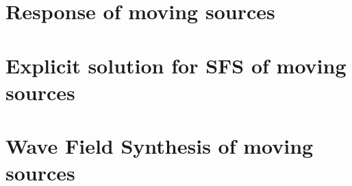 \section{Response of moving sources}

\section{Explicit solution for SFS of moving sources}

\section{Wave Field Synthesis of moving sources}
